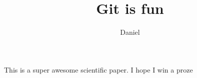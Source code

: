 \documentclass[10pt]{article}
\author{Daniel}
\title{Git is fun}
\begin{document}
        \maketitle

        This is a super awesome scientific paper.
        I hope I win a proze
\end{document}
